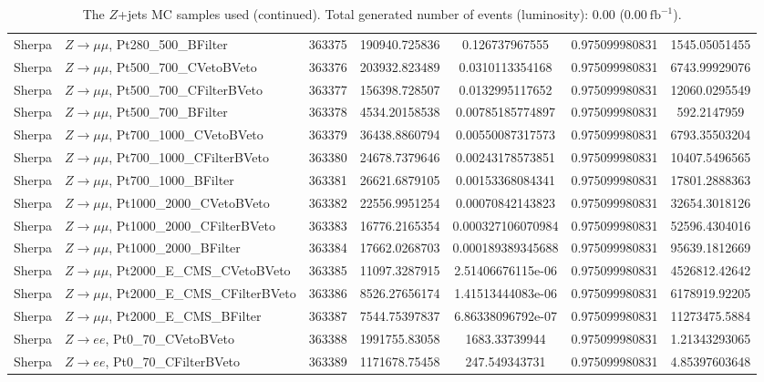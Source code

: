 \begin{table}[h]
\begin{center}
\begin{tabular}{|l|l|c|
S[table-parse-only, round-precision=4]|
S[table-parse-only, round-precision=3]|
S[table-parse-only, round-precision=3]|
S[table-parse-only, round-precision=3]|
}
Sherpa & $Z\rightarrow\mu\mu$, Pt280\_500\_BFilter & 363375 & 190940.725836 & 0.126737967555 & 0.975099980831 & 1545.05051455 \\
Sherpa & $Z\rightarrow\mu\mu$, Pt500\_700\_CVetoBVeto & 363376 & 203932.823489 & 0.0310113354168 & 0.975099980831 & 6743.99929076 \\
Sherpa & $Z\rightarrow\mu\mu$, Pt500\_700\_CFilterBVeto & 363377 & 156398.728507 & 0.0132995117652 & 0.975099980831 & 12060.0295549 \\
Sherpa & $Z\rightarrow\mu\mu$, Pt500\_700\_BFilter & 363378 & 4534.20158538 & 0.00785185774897 & 0.975099980831 & 592.2147959 \\
Sherpa & $Z\rightarrow\mu\mu$, Pt700\_1000\_CVetoBVeto & 363379 & 36438.8860794 & 0.00550087317573 & 0.975099980831 & 6793.35503204 \\
Sherpa & $Z\rightarrow\mu\mu$, Pt700\_1000\_CFilterBVeto & 363380 & 24678.7379646 & 0.00243178573851 & 0.975099980831 & 10407.5496565 \\
Sherpa & $Z\rightarrow\mu\mu$, Pt700\_1000\_BFilter & 363381 & 26621.6879105 & 0.00153368084341 & 0.975099980831 & 17801.2888363 \\
Sherpa & $Z\rightarrow\mu\mu$, Pt1000\_2000\_CVetoBVeto & 363382 & 22556.9951254 & 0.00070842143823 & 0.975099980831 & 32654.3018126 \\
Sherpa & $Z\rightarrow\mu\mu$, Pt1000\_2000\_CFilterBVeto & 363383 & 16776.2165354 & 0.000327106070984 & 0.975099980831 & 52596.4304016 \\
Sherpa & $Z\rightarrow\mu\mu$, Pt1000\_2000\_BFilter & 363384 & 17662.0268703 & 0.000189389345688 & 0.975099980831 & 95639.1812669 \\
Sherpa & $Z\rightarrow\mu\mu$, Pt2000\_E\_CMS\_CVetoBVeto & 363385 & 11097.3287915 & 2.51406676115e-06 & 0.975099980831 & 4526812.42642 \\
Sherpa & $Z\rightarrow\mu\mu$, Pt2000\_E\_CMS\_CFilterBVeto & 363386 & 8526.27656174 & 1.41513444083e-06 & 0.975099980831 & 6178919.92205 \\
Sherpa & $Z\rightarrow\mu\mu$, Pt2000\_E\_CMS\_BFilter & 363387 & 7544.75397837 & 6.86338096792e-07 & 0.975099980831 & 11273475.5884 \\
Sherpa & $Z\rightarrow ee$, Pt0\_70\_CVetoBVeto & 363388 & 1991755.83058 & 1683.33739944 & 0.975099980831 & 1.21343293065 \\
Sherpa & $Z\rightarrow ee$, Pt0\_70\_CFilterBVeto & 363389 & 1171678.75458 & 247.549343731 & 0.975099980831 & 4.85397603648 \\
\bottomrule
\end{tabular}
\caption{The $Z$+jets MC samples used (continued). Total generated number of events (luminosity): 0.00 (0.00$~\mathrm{fb}^{-1}$).}
\label{tab:app:datamcZ_sherpa_220}
\end{center}
\end{table}
